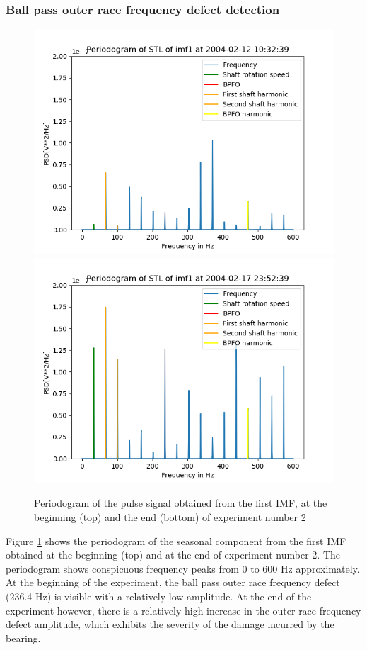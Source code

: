 \documentclass[../Main/thesis.tex]{subfiles}
\begin{document}
\subsubsection{Ball pass outer race frequency defect detection} 
 \begin{figure}[H]
 	\centering
 	\includegraphics[width=0.8\linewidth]{../fig/periodogram_bpfo/start_imf1_bpfo}
 	\includegraphics[width=0.8\linewidth]{../fig/periodogram_bpfo/end_imf1_bpfo}
 	\caption{Periodogram of the pulse signal obtained from the first IMF, at the beginning (top) and the end (bottom) of experiment number 2}
 	\label{fig:startimf1bpfo}
 \end{figure}
\justify
Figure \ref{fig:startimf1bpfo} shows the periodogram of the seasonal component from the first IMF obtained at the beginning (top) and at the end of experiment number 2. The periodogram shows conspicuous frequency peaks from 0 to 600 Hz approximately. At the beginning of the experiment, the ball pass outer race frequency defect (236.4 Hz) is visible with a relatively low amplitude. At the end of the experiment however, there is a relatively high increase in the outer race frequency defect amplitude, which exhibits the severity of the damage incurred by the bearing.
\end{document}
